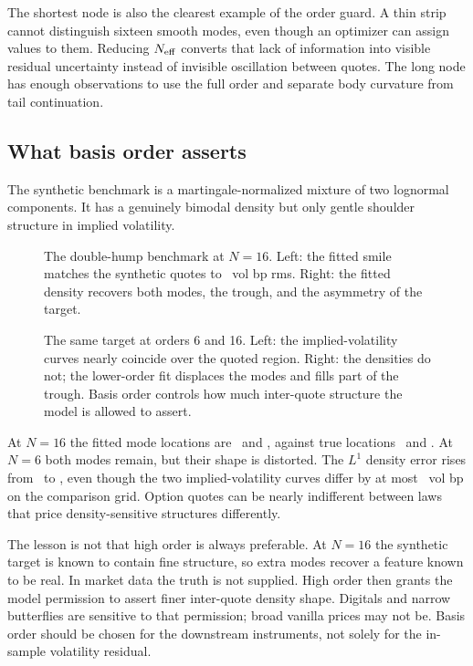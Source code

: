 The shortest node is also the clearest example of the order guard.  A thin
strip cannot distinguish sixteen smooth modes, even though an optimizer can
assign values to them.  Reducing $N_{\rm eff}$ converts that lack of
information into visible residual uncertainty instead of invisible
oscillation between quotes.  The long node has enough observations to use the
full order and separate body curvature from tail continuation.

\subsection{What basis order asserts}

The synthetic benchmark is a martingale-normalized mixture of two lognormal
components.  It has a genuinely bimodal density but only gentle shoulder
structure in implied volatility.

\begin{figure}[htbp]
\centering
{}
\caption{The double-hump benchmark at $N=16$.  Left: the fitted smile matches
the synthetic quotes to \MacHumpFitRmsBp\ vol bp rms.  Right: the fitted
density recovers both modes, the trough, and the asymmetry of the target.}
\label{fig:doublehump}
\end{figure}

\begin{figure}[htbp]
\centering
{}
\caption{The same target at orders 6 and 16.  Left: the implied-volatility
curves nearly coincide over the quoted region.  Right: the densities do not;
the lower-order fit displaces the modes and fills part of the trough.  Basis
order controls how much inter-quote structure the model is allowed to assert.}
\label{fig:order_control}
\end{figure}

At $N=16$ the fitted mode locations are \MacDhModeLeft\ and
\MacDhModeRight, against true locations \MacDhTrueModeLeft\ and
\MacDhTrueModeRight.  At $N=6$ both modes remain, but their shape is distorted.
The $L^1$ density error rises from \MacHumpLOneNSixteen\ to
\MacHumpLOneNSix, even though the two implied-volatility curves differ by at
most \MacHumpIvAgreeBp\ vol bp on the comparison grid.  Option quotes can be
nearly indifferent between laws that price density-sensitive structures
differently.

The lesson is not that high order is always preferable.  At $N=16$ the
synthetic target is known to contain fine structure, so extra modes recover a
feature known to be real.  In market data the truth is not supplied.  High
order then grants the model permission to assert finer inter-quote density
shape.  Digitals and narrow butterflies are sensitive to that permission;
broad vanilla prices may not be.  Basis order should be chosen for the
downstream instruments, not solely for the in-sample volatility residual.

